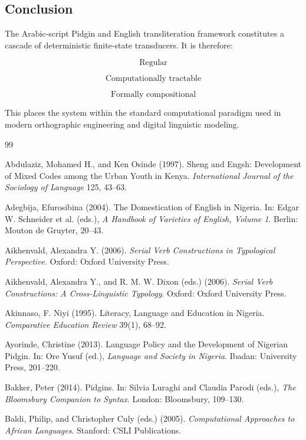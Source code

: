 \documentclass[12pt]{article}
\begin{document}
\subsection{Conclusion}

The Arabic-script Pidgin and English transliteration framework constitutes a cascade of deterministic finite-state transducers. It is therefore:

\[
\text{Regular}
\]

\[
\text{Computationally tractable}
\]

\[
\text{Formally compositional}
\]

This places the system within the standard computational paradigm used in modern orthographic engineering and digital linguistic modeling.

\newpage
\newpage
\begin{thebibliography}{99}

Abdulaziz, Mohamed H., and Ken Osinde (1997).
Sheng and Engsh: Development of Mixed Codes among the Urban Youth in Kenya.
\textit{International Journal of the Sociology of Language} 125, 43--63.

Adegbija, Efurosibina (2004).
The Domestication of English in Nigeria.
In: Edgar W. Schneider et al. (eds.),
\textit{A Handbook of Varieties of English, Volume 1}.
Berlin: Mouton de Gruyter, 20--43.

Aikhenvald, Alexandra Y. (2006).
\textit{Serial Verb Constructions in Typological Perspective}.
Oxford: Oxford University Press.

Aikhenvald, Alexandra Y., and R. M. W. Dixon (eds.) (2006).
\textit{Serial Verb Constructions: A Cross-Linguistic Typology}.
Oxford: Oxford University Press.

Akinnaso, F. Niyi (1995).
Literacy, Language and Education in Nigeria.
\textit{Comparative Education Review} 39(1), 68--92.

Ayorinde, Christine (2013).
Language Policy and the Development of Nigerian Pidgin.
In: Ore Yusuf (ed.),
\textit{Language and Society in Nigeria}.
Ibadan: University Press, 201--220.

Bakker, Peter (2014).
Pidgins.
In: Silvia Luraghi and Claudia Parodi (eds.),
\textit{The Bloomsbury Companion to Syntax}.
London: Bloomsbury, 109--130.

Baldi, Philip, and Christopher Culy (eds.) (2005).
\textit{Computational Approaches to African Languages}.
Stanford: CSLI Publications.


\end{thebibliography}
\end{document}
